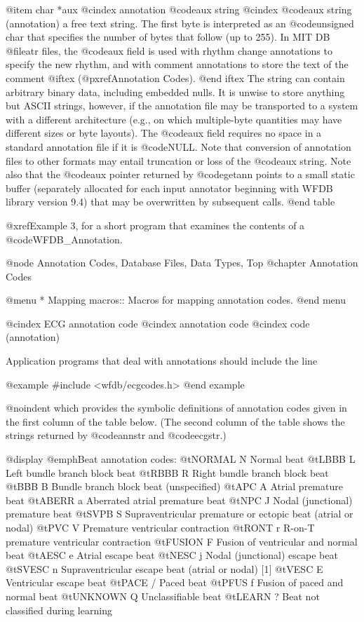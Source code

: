{{{{{{{{{{@item char *aux
@cindex annotation @code{aux} string
@cindex @code{aux} string (annotation)
a free text string.  The first byte is interpreted as an @code{unsigned
char} that specifies the number of bytes that follow (up to 255).  In
MIT DB @file{atr} files, the @code{aux} field is used with rhythm
change annotations to specify the new rhythm, and with comment
annotations to store the text of the comment
@iftex
(@pxref{Annotation Codes}).
@end iftex
The string can contain arbitrary binary
data, including embedded nulls.  It is unwise to store anything but ASCII
strings, however, if the annotation file may be transported to a system with
a different architecture (e.g., on which multiple-byte quantities may have
different sizes or byte layouts).  The @code{aux} field requires no
space in a standard annotation file if it is @code{NULL}.  Note that
conversion of annotation files to other formats may entail truncation or
loss of the @code{aux} string.  Note also that the @code{aux} pointer
returned by @code{getann} points to a small static buffer (separately
allocated for each input annotator beginning with WFDB library version
9.4) that may be overwritten by subsequent calls.
@end table

@xref{Example 3}, for a short program that examines the contents of a
@code{WFDB_Annotation}.

@node     Annotation Codes, Database Files, Data Types, Top
@chapter Annotation Codes

@menu
* Mapping macros::		Macros for mapping annotation codes.
@end menu

@cindex ECG annotation code
@cindex annotation code
@cindex code (annotation)

Application programs that deal with annotations should include the
line

@example
#include <wfdb/ecgcodes.h>
@end example

@noindent
which provides the symbolic definitions of annotation codes given in the
first column of the table below.  (The second column of the table shows
the strings returned by @code{annstr} and @code{ecgstr}.)

@display
@emph{Beat annotation codes:}
@t{NORMAL   N  } Normal beat
@t{LBBB     L  } Left bundle branch block beat
@t{RBBB     R  } Right bundle branch block beat
@t{BBB      B  } Bundle branch block beat (unspecified)
@t{APC      A  } Atrial premature beat
@t{ABERR    a  } Aberrated atrial premature beat
@t{NPC      J  } Nodal (junctional) premature beat
@t{SVPB     S  } Supraventricular premature or ectopic beat (atrial or nodal)
@t{PVC      V  } Premature ventricular contraction
@t{RONT     r  } R-on-T premature ventricular contraction
@t{FUSION   F  } Fusion of ventricular and normal beat
@t{AESC     e  } Atrial escape beat
@t{NESC     j  } Nodal (junctional) escape beat
@t{SVESC    n  } Supraventricular escape beat (atrial or nodal) [1]
@t{VESC     E  } Ventricular escape beat
@t{PACE     /  } Paced beat
@t{PFUS     f  } Fusion of paced and normal beat
@t{UNKNOWN  Q  } Unclassifiable beat
@t{LEARN    ?  } Beat not classified during learning

}}}}}}}}}}
